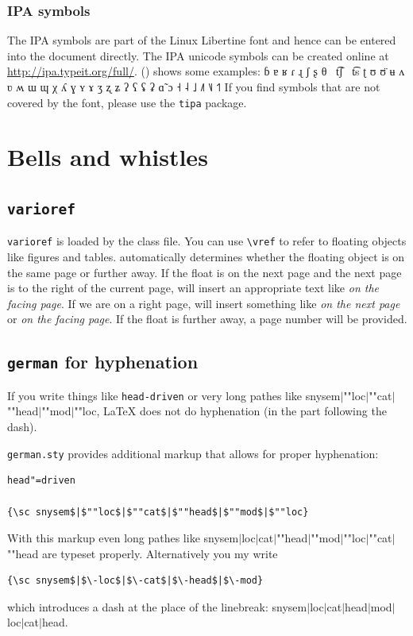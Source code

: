 \subsubsection{IPA symbols}

The IPA symbols are part of the Linux Libertine font and hence can be entered into the document
directly. The IPA unicode symbols can be created online at
\url{http://ipa.typeit.org/full/}. () shows some examples:
\ea
ɓ ɐ ʁ ɾ ɻ ʃ ʂ θ~  t͡ʃ~  t͡s  ʈ ʊ ʊ̈ ʉ ʌ ʋ ʍ ɯ ɰ χ ʎ ɣ ʏ ɤ ʒ ʐ ʑ ʔ ʕ ʢ ʡ ɑ̃ ɔ ˧ ˨ ˩ ˩˥ ˥˩ ˦˥
\z
If you find symbols that are not covered by the font, please use the \texttt{tipa} package.

\section{Bells and whistles}

\subsection{\texttt{varioref}}

\texttt{varioref} is loaded by the \lsp class file. You can use \verb+\vref+ to refer to floating
objects like figures and tables. \latex automatically determines whether the floating object is on
the same page or further away. If the float is on the next page and the next page is to the right of
the current page, \latex will insert an appropriate text like \emph{on the facing page}. If we are
on a right page, \latex will insert something like \emph{on the next page} or \emph{on the facing page}. If the float is further
away, a page number will be provided.



\subsection{\texttt{german} for hyphenation}

If you write things like \verb+head-driven+ or very long pathes like
{\sc snysem$|$""loc$|$""cat$|$""head$|$""mod$|$""loc}, \LaTeX{} does not do hyphenation
(in the part following the dash).

\verb+german.sty+ provides additional markup that allows for proper hyphenation:
\begin{verbatim}
head"=driven

{\sc snysem$|$""loc$|$""cat$|$""head$|$""mod$|$""loc}
\end{verbatim}
With this markup even long pathes like {\sc snysem$|$loc$|$cat$|$""head$|$""mod$|$""loc$|$""cat$|$""head}
are typeset properly. Alternatively you my write
\begin{verbatim}
{\sc snysem$|$\-loc$|$\-cat$|$\-head$|$\-mod}
\end{verbatim}
which introduces a dash at the place of the linebreak:
{\sc snysem$|$\-loc$|$\-cat$|$\-head$|$\-mod$|$\-loc$|$\-cat$|$\-head}.

